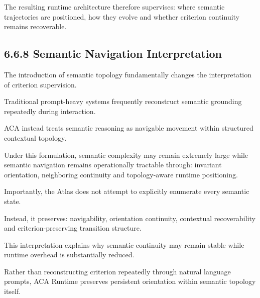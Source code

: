 \documentclass[11pt]{article}
\begin{document}
The resulting runtime architecture therefore supervises: where semantic trajectories are positioned, how they evolve and whether criterion continuity remains recoverable.

\subsection{6.6.8 Semantic Navigation Interpretation}

The introduction of semantic topology fundamentally changes the interpretation of criterion supervision.

Traditional prompt-heavy systems frequently reconstruct semantic grounding repeatedly during interaction.

ACA instead treats semantic reasoning as navigable movement within structured contextual topology.

Under this formulation, semantic complexity may remain extremely large while semantic navigation remains operationally tractable through: invariant orientation, neighboring continuity and topology-aware runtime positioning.

Importantly, the Atlas does not attempt to explicitly enumerate every semantic state.

Instead, it preserves: navigability, orientation continuity, contextual recoverability and criterion-preserving transition structure.

This interpretation explains why semantic continuity may remain stable while runtime overhead is substantially reduced.

Rather than reconstructing criterion repeatedly through natural language prompts, ACA Runtime preserves persistent orientation within semantic topology itself.
\end{document}
